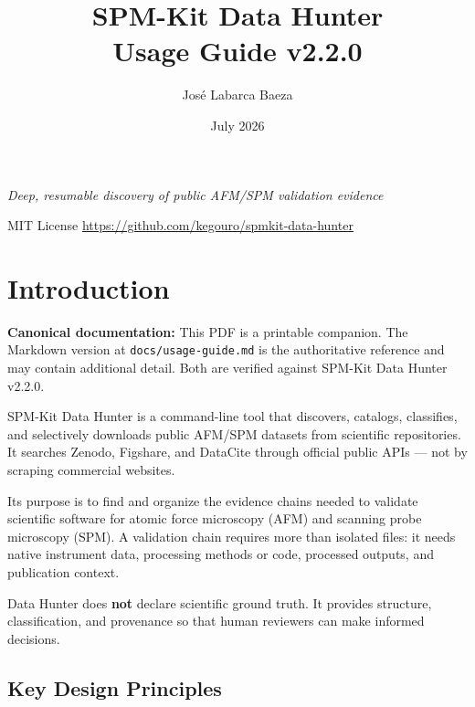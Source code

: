 \documentclass[11pt,a4paper]{article}
\title{\textbf{SPM-Kit Data Hunter}\\[4pt]\Large Usage Guide v2.2.0}
\author{José Labarca Baeza}
\date{July 2026}
\begin{document}
\maketitle
\thispagestyle{empty}

\begin{center}
\textit{Deep, resumable discovery of public AFM/SPM validation evidence}

\vspace{8pt}
MIT License \textbar{} \url{https://github.com/kegouro/spmkit-data-hunter}
\end{center}

\vspace{12pt}
\tableofcontents
\newpage

\section{Introduction}

\begin{infobox}
\textbf{Canonical documentation:} This PDF is a printable companion. The Markdown version at \texttt{docs/usage-guide.md} is the authoritative reference and may contain additional detail. Both are verified against SPM-Kit Data Hunter v2.2.0.
\end{infobox}

\vspace{8pt}

SPM-Kit Data Hunter is a command-line tool that discovers, catalogs, classifies, and selectively downloads public AFM/SPM datasets from scientific repositories. It searches Zenodo, Figshare, and DataCite through official public APIs --- not by scraping commercial websites.

Its purpose is to find and organize the evidence chains needed to validate scientific software for atomic force microscopy (AFM) and scanning probe microscopy (SPM). A validation chain requires more than isolated files: it needs native instrument data, processing methods or code, processed outputs, and publication context.

Data Hunter does \textbf{not} declare scientific ground truth. It provides structure, classification, and provenance so that human reviewers can make informed decisions.

\subsection*{Key Design Principles}
\end{document}
